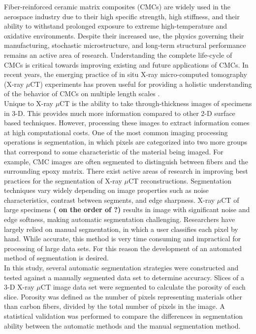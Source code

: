 \documentclass[11pt, twocolumn]{article}
\begin{document}
Fiber-reinforced ceramic matrix composites (CMCs) are widely used in the aerospace industry due to their high specific strength, high stiffness, and their ability to withstand prolonged exposure to extreme high-temperature and oxidative environments. Despite their increased use, the physics governing their manufacturing, stochastic microstructure, and long-term structural performance remains an active area of research. Understanding the complete life-cycle of CMCs is critical towards improving  existing and future applications of CMCs. In recent years, the emerging practice of in situ X-ray micro-computed tomography (X-ray $\mu$CT) experiments has proven useful for providing a holistic understanding of the behavior of CMCs on multiple length scales \cite{Larson,Bale,Bale2,Cox,Haboub,Marshall}.\\
Unique to X-ray $\mu$CT is the ability to take through-thickness images of specimens in 3-D. This provides much more information compared to other 2-D surface based techniques. However, processing these images to extract information comes at high computational costs. One of the most common imaging processing operations is segmentation, in which pixels are categorized into two more groups that correspond to some characteristic of the material being imaged. For example, CMC images are often segmented to distinguish between fibers and the surrounding epoxy matrix. There exist active areas of research in improving best practices for the segmentation of X-ray $\mu$CT reconstructions. Segmentation techniques vary widely depending on image properties such as noise characteristics, contrast between segments, and edge sharpness. X-ray $\mu$CT of large specimens \textbf{( on the order of ?)} results in image with significant noise and edge softness, making automatic segmentation challenging. Researchers have largely relied on manual segmentation, in which a user classifies each pixel by hand. While accurate, this method is very time consuming and impractical for processing of large data sets. For this reason the development of an automated method of segmentation is desired.\\
In this study, several automatic segmentation strategies were constructed and tested against a manually segmented data set to determine accuracy. Slices of a 3-D X-ray $\mu$CT image data set were segmented to calculate the porosity of each slice. Porosity was defined as the number of pixels representing materials other than carbon fibers, divided by the total number of pixels in the image. A statistical validation was performed to compare the differences in segmentation ability between the automatic methods and the manual segmentation method.
\end{document}
